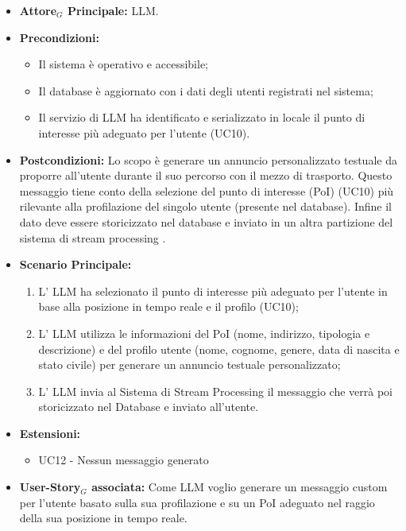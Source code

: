 \documentclass[11pt]{article}
\begin{document}
\begin{justify}
\label{UC11}
\begin{itemize}
    \item \textbf{Attore$_G$ Principale:} LLM.
    \item \textbf{Precondizioni:} 
        \begin{itemize}
          \item Il sistema è operativo e accessibile;
          \item Il database è aggiornato con i dati degli utenti registrati nel sistema;
            \item Il servizio di LLM ha identificato e serializzato in locale il punto di interesse più adeguato per l'utente (UC10).
        \end{itemize}
      \item \textbf{Postcondizioni:} Lo scopo è generare un annuncio personalizzato testuale da proporre all'utente durante il suo percorso con il mezzo di trasporto. Questo messaggio tiene conto della selezione del punto di interesse (PoI) (UC10) più rilevante alla profilazione del singolo utente (presente nel database). Infine il dato deve essere storicizzato nel database e inviato in un altra partizione del sistema di stream processing .\\
    \item \textbf{Scenario Principale:} 
        \begin{enumerate}
        \item L' LLM ha selezionato il punto di interesse più adeguato per l'utente in base alla posizione in tempo reale e il profilo (UC10);
        \item L' LLM utilizza le informazioni del PoI (nome, indirizzo, tipologia e descrizione) e del profilo utente (nome, cognome, genere, data di nascita e stato civile) per generare un annuncio testuale personalizzato;
        \item L' LLM invia al Sistema di Stream Processing il messaggio che verrà poi storicizzato nel Database e inviato all'utente.
        \end{enumerate}
    \item \textbf{Estensioni: } 
    \begin{itemize}
        \item UC12 - Nessun messaggio generato
    \end{itemize}
    \item \textbf{User-Story$_G$ associata:} Come LLM voglio generare un messaggio custom per l'utente basato sulla sua profilazione e su un PoI adeguato nel raggio della sua posizione in tempo reale.
\end{itemize}



\end{justify}
\end{document}
